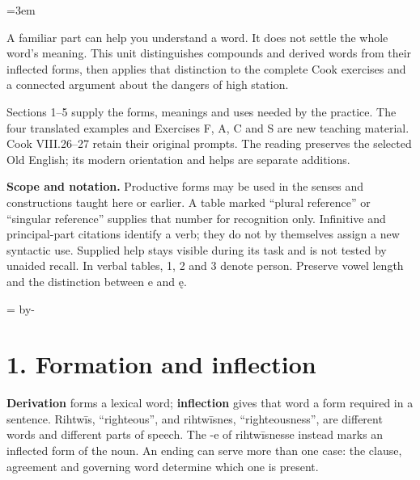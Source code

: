 \BookRecto
\begingroup
\renewcommand{\runningtitle}{Unit 14. Word formation and lexical families}
\emergencystretch=3em
\newcommand{\itempara}[2]{\par\addvspace{3pt}\noindent\hangindent=1.8em\hangafter=1\makebox[1.8em][l]{#1.}#2\par}
\newcommand{\reserve}[1]{\par\penalty-100\begingroup\dimen0=\pagegoal\advance\dimen0 by-\pagetotal\ifdim\dimen0<#1\newpage\fi\endgroup}

\raggedright
{}

A familiar part can help you understand a word. It does not settle the whole word’s meaning. This unit distinguishes compounds and derived words from their inflected forms, then applies that distinction to the complete Cook exercises and a connected argument about the dangers of high station.

Sections 1–5 supply the forms, meanings and uses needed by the practice. The four translated examples and Exercises F, A, C and S are new teaching material. Cook VIII.26–27 retain their original prompts. The reading preserves the selected Old English; its modern orientation and helps are separate additions.

\textbf{Scope and notation.} Productive forms may be used in the senses and constructions taught here or earlier. A table marked “plural reference” or “singular reference” supplies that number for recognition only. Infinitive and principal-part citations identify a verb; they do not by themselves assign a new syntactic use. Supplied help stays visible during its task and is not tested by unaided recall. In verbal tables, 1, 2 and 3 denote person. Preserve vowel length and the distinction between e and ę.

\reserve{7\baselineskip}
\section*{1. Formation and inflection}

\textbf{Derivation} forms a lexical word; \textbf{inflection} gives that word a form required in a sentence. Rihtwīs, “righteous”, and rihtwīsnes, “righteousness”, are different words and different parts of speech. The -e of rihtwīsnesse instead marks an inflected form of the noun. An ending can serve more than one case: the clause, agreement and governing word determine which one is present.

